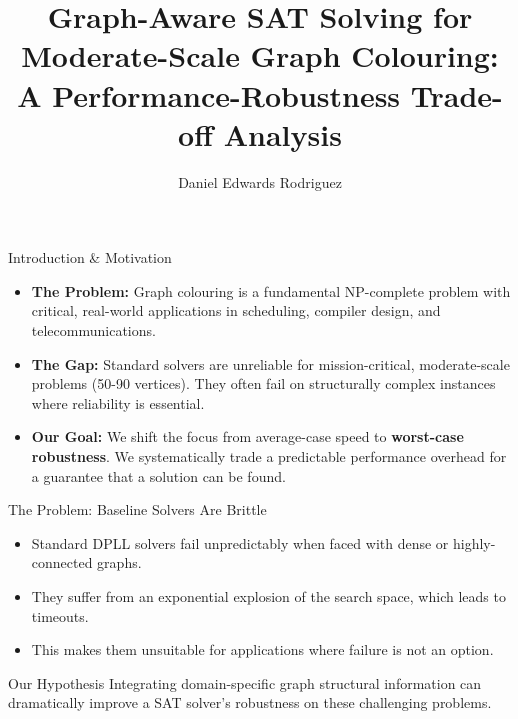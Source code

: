 \documentclass[11pt]{beamer}
\author[Daniel Edwards Rodriguez]{Daniel Edwards Rodriguez}
\title[Graph-Aware SAT Solving]{Graph-Aware SAT Solving for Moderate-Scale Graph Colouring: A Performance-Robustness Trade-off Analysis}
\institute[KCL]{King's College London \\ Supervisor: Professor Hana Chockler}
\begin{document}
\begin{frame}
\titlepage
\end{frame}

\begin{frame}{Introduction \& Motivation}
    \begin{itemize}
        \item \textbf{The Problem:} Graph colouring is a fundamental NP-complete problem with critical, real-world applications in scheduling, compiler design, and telecommunications.
        \item \textbf{The Gap:} Standard solvers are unreliable for mission-critical, moderate-scale problems (50-90 vertices). They often fail on structurally complex instances where reliability is essential.
        \item \textbf{Our Goal:} We shift the focus from average-case speed to \textbf{worst-case robustness}. We systematically trade a predictable performance overhead for a guarantee that a solution can be found.
    \end{itemize}
\end{frame}

\begin{frame}{The Problem: Baseline Solvers Are Brittle}
    \begin{itemize}
        \item Standard DPLL solvers fail unpredictably when faced with dense or highly-connected graphs.
        \item They suffer from an exponential explosion of the search space, which leads to timeouts.
        \item This makes them unsuitable for applications where failure is not an option.
    \end{itemize}
    \vfill
    \begin{block}{Our Hypothesis}
        Integrating domain-specific graph structural information can dramatically improve a SAT solver's robustness on these challenging problems.
    \end{block}
\end{frame}
\end{document}
